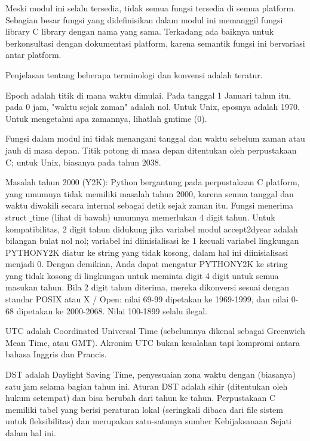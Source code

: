 \vspace{12pt}
\noindent 
Meski modul ini selalu tersedia, tidak semua fungsi tersedia di semua platform. Sebagian besar fungsi yang didefinisikan dalam modul ini memanggil fungsi library C library dengan nama yang sama. Terkadang ada baiknya untuk berkonsultasi dengan dokumentasi platform, karena semantik fungsi ini bervariasi antar platform. \par
\noindent 
Penjelasan tentang beberapa terminologi dan konvensi adalah teratur. \par
\vspace{12pt}
\noindent 
Epoch adalah titik di mana waktu dimulai. Pada tanggal 1 Januari tahun itu, pada 0 jam, "waktu sejak zaman" adalah nol. Untuk Unix, eposnya adalah 1970. Untuk mengetahui apa zamannya, lihatlah gmtime (0). \par
\vspace{12pt}
\noindent 
Fungsi dalam modul ini tidak menangani tanggal dan waktu sebelum zaman atau jauh di masa depan. Titik potong di masa depan ditentukan oleh perpustakaan C; untuk Unix, biasanya pada tahun 2038. \par
\vspace{12pt}
\noindent 
Masalah tahun 2000 (Y2K): Python bergantung pada perpustakaan C platform, yang umumnya tidak memiliki masalah tahun 2000, karena semua tanggal dan waktu diwakili secara internal sebagai detik sejak zaman itu. Fungsi menerima struct $  \_  $time (lihat di bawah) umumnya memerlukan 4 digit tahun. Untuk kompatibilitas, 2 digit tahun didukung jika variabel modul accept2dyear adalah bilangan bulat nol nol; variabel ini diinisialisasi ke 1 kecuali variabel lingkungan PYTHONY2K diatur ke string yang tidak kosong, dalam hal ini diinisialisasi menjadi 0. Dengan demikian, Anda dapat mengatur PYTHONY2K ke string yang tidak kosong di lingkungan untuk meminta digit 4 digit untuk semua masukan tahun. Bila 2 digit tahun diterima, mereka dikonversi sesuai dengan standar POSIX atau X / Open: nilai 69-99 dipetakan ke 1969-1999, dan nilai 0-68 dipetakan ke 2000-2068. Nilai 100-1899 selalu ilegal. \par
\vspace{12pt}
\noindent 
UTC adalah Coordinated Universal Time (sebelumnya dikenal sebagai Greenwich Mean Time, atau GMT). Akronim UTC bukan kesalahan tapi kompromi antara bahasa Inggris dan Prancis. \par
\vspace{12pt}
\noindent 
DST adalah Daylight Saving Time, penyesuaian zona waktu dengan (biasanya) satu jam selama bagian tahun ini. Aturan DST adalah sihir (ditentukan oleh hukum setempat) dan bisa berubah dari tahun ke tahun. Perpustakaan C memiliki tabel yang berisi peraturan lokal (seringkali dibaca dari file sistem untuk fleksibilitas) dan merupakan satu-satunya sumber Kebijaksanaan Sejati dalam hal ini. \par
